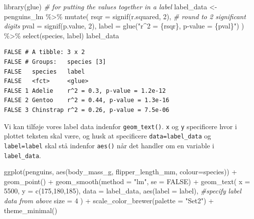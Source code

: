 \documentclass[
]{book}
\newenvironment{Shaded}{\begin{snugshade}}{\end{snugshade}}
\newcommand{\AttributeTok}[1]{\textcolor[rgb]{0.77,0.63,0.00}{#1}}
\newcommand{\CommentTok}[1]{\textcolor[rgb]{0.56,0.35,0.01}{\textit{#1}}}
\newcommand{\ConstantTok}[1]{\textcolor[rgb]{0.00,0.00,0.00}{#1}}
\newcommand{\DecValTok}[1]{\textcolor[rgb]{0.00,0.00,0.81}{#1}}
\newcommand{\FunctionTok}[1]{\textcolor[rgb]{0.00,0.00,0.00}{#1}}
\newcommand{\NormalTok}[1]{#1}
\newcommand{\OtherTok}[1]{\textcolor[rgb]{0.56,0.35,0.01}{#1}}
\newcommand{\SpecialCharTok}[1]{\textcolor[rgb]{0.00,0.00,0.00}{#1}}
\newcommand{\StringTok}[1]{\textcolor[rgb]{0.31,0.60,0.02}{#1}}
\begin{document}
\begin{Shaded}
\begin{Highlighting}[]
\FunctionTok{library}\NormalTok{(glue)  }\CommentTok{\# for putting the values together in a label}
\NormalTok{label\_data }\OtherTok{\textless{}{-}}\NormalTok{ penguins\_lm }\SpecialCharTok{\%\textgreater{}\%}
  \FunctionTok{mutate}\NormalTok{(}
    \AttributeTok{rsqr =} \FunctionTok{signif}\NormalTok{(r.squared, }\DecValTok{2}\NormalTok{),  }\CommentTok{\# round to 2 significant digits}
    \AttributeTok{pval =} \FunctionTok{signif}\NormalTok{(p.value, }\DecValTok{2}\NormalTok{),}
    \AttributeTok{label =} \FunctionTok{glue}\NormalTok{(}\StringTok{"r\^{}2 = \{rsqr\}, p{-}value = \{pval\}"}\NormalTok{)}
\NormalTok{  ) }\SpecialCharTok{\%\textgreater{}\%}
  \FunctionTok{select}\NormalTok{(species, label)}
\NormalTok{label\_data}
\end{Highlighting}
\end{Shaded}

\begin{verbatim}
FALSE # A tibble: 3 x 2
FALSE # Groups:   species [3]
FALSE   species   label                        
FALSE   <fct>     <glue>                       
FALSE 1 Adelie    r^2 = 0.3, p-value = 1.2e-12 
FALSE 2 Gentoo    r^2 = 0.44, p-value = 1.3e-16
FALSE 3 Chinstrap r^2 = 0.26, p-value = 7.5e-06
\end{verbatim}

Vi kan tilføje vores label data indenfor \texttt{geom\_text()}. \texttt{x} og \texttt{y} specificere hvor i plottet teksten skal være, og husk at specificere \texttt{data=label\_data} og \texttt{label=label} skal stå indenfor \texttt{aes()} når det handler om en variable i \texttt{label\_data}.

\begin{Shaded}
\begin{Highlighting}[]
\FunctionTok{ggplot}\NormalTok{(penguins, }\FunctionTok{aes}\NormalTok{(body\_mass\_g, flipper\_length\_mm, }\AttributeTok{colour=}\NormalTok{species)) }\SpecialCharTok{+} 
  \FunctionTok{geom\_point}\NormalTok{() }\SpecialCharTok{+}
  \FunctionTok{geom\_smooth}\NormalTok{(}\AttributeTok{method =} \StringTok{"lm"}\NormalTok{, }\AttributeTok{se =} \ConstantTok{FALSE}\NormalTok{) }\SpecialCharTok{+}
  \FunctionTok{geom\_text}\NormalTok{(}
    \AttributeTok{x =} \DecValTok{5500}\NormalTok{, }
    \AttributeTok{y =} \FunctionTok{c}\NormalTok{(}\DecValTok{175}\NormalTok{,}\DecValTok{180}\NormalTok{,}\DecValTok{185}\NormalTok{),}
    \AttributeTok{data =}\NormalTok{ label\_data, }\FunctionTok{aes}\NormalTok{(}\AttributeTok{label =}\NormalTok{ label), }\CommentTok{\#specify label data from above}
    \AttributeTok{size =} \DecValTok{4}
\NormalTok{  ) }\SpecialCharTok{+} 
  \FunctionTok{scale\_color\_brewer}\NormalTok{(}\AttributeTok{palette =} \StringTok{"Set2"}\NormalTok{) }\SpecialCharTok{+}
  \FunctionTok{theme\_minimal}\NormalTok{() }
\end{Highlighting}
\end{Shaded}
\end{document}
